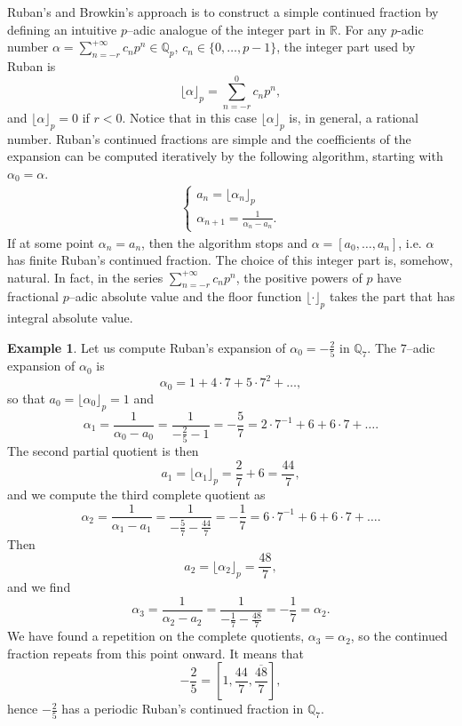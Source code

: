 \documentclass[12pt, reqno]{amsart}
\theoremstyle{plain}
\theoremstyle{definition}
\newtheorem{Example}[Theorem]{Example}
\begin{document}
Ruban's \cite{RUB} and Browkin's \cite{BI, BII} approach is to construct a simple continued fraction by defining an intuitive $p$--adic analogue of the integer part in $\mathbb{R}$.  For any $p$-adic number $\alpha=\sum\limits_{n=-r}^{+\infty} c_np^n\in\mathbb{Q}_p$, $c_n\in\{0,\ldots,p-1\}$,
the integer part used by Ruban is
\[\lfloor \alpha \rfloor_p =\sum\limits_{n=-r}^{0} c_np^n,\]
and $\lfloor \alpha \rfloor_p=0$ if $r<0$. Notice that in this case $\lfloor \alpha \rfloor_p$ is, in general, a rational number. Ruban's continued fractions are simple and the coefficients of the expansion can be computed iteratively by the following algorithm, starting with $\alpha_0=\alpha$.
\begin{align} 
\begin{cases}\label{Alg: Rub}
a_n=\lfloor \alpha_n \rfloor_p\\
\alpha_{n+1}=\frac{1}{\alpha_n-a_n}.
\end{cases}
\end{align}
If at some point $\alpha_n=a_n$, then the algorithm stops and $\alpha=[a_0,\ldots,a_n]$, i.e. $\alpha$ has finite Ruban's continued fraction. The choice of this integer part is, somehow, natural. In fact, in the series $\sum\limits_{n=-r}^{+\infty} c_np^n$, the positive powers of $p$ have fractional $p$--adic absolute value and the floor function $\lfloor \cdot \rfloor_p$ takes the part that has integral absolute value.
\begin{Example}\label{Exa: Ruban}
Let us compute Ruban's expansion of $\alpha_0=-\frac{2}{5}$ in $\mathbb{Q}_7$. The $7$--adic expansion of $\alpha_0$ is
\[\alpha_0 = 1 + 4 \cdot 7 + 5\cdot 7^2 + \ldots,\]
so that $a_0= \lfloor\alpha_0 \rfloor_p = 1$ and
\[\alpha_1 =\frac{1}{\alpha_0-a_0}=\frac{1}{-\frac{2}{5}-1}= -\frac{5}{7} = 2 \cdot 7^{-1} +6 +6 \cdot 7 + \ldots.\]
The second partial quotient is then
\[a_1=\lfloor\alpha_1 \rfloor_p=\frac{2}{7}+6=\frac{44}{7},\]
and we compute the third complete quotient as
\[\alpha_2 =\frac{1}{\alpha_1-a_1}=\frac{1}{-\frac{5}{7}-\frac{44}{7}}= -\frac{1}{7} = 6 \cdot 7^{-1} +6 +6 \cdot 7 + \ldots.\]
Then
\[a_2=\lfloor \alpha_2 \rfloor_p=\frac{48}{7},\]
and we find
\[\alpha_3=\frac{1}{\alpha_2-a_2}=\frac{1}{-\frac{1}{7}-\frac{48}{7}}=-\frac{1}{7}=\alpha_2.\]
 We have found a repetition on the complete quotients, $\alpha_3=\alpha_2$, so the continued fraction repeats from this point onward. It means that
\[-\frac{2}{5}=\left[1,\frac{44}{7},\overline{\frac{48}{7}} \right],\]
hence $-\frac{2}{5}$ has a periodic Ruban's continued fraction in $\mathbb{Q}_7$.
\end{Example}
\end{document}
